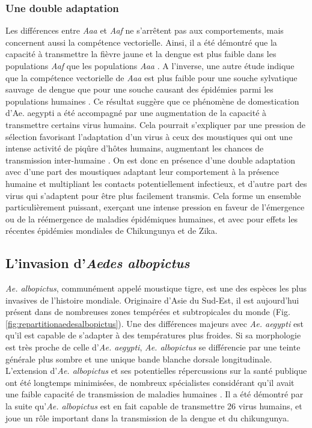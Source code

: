 \subsubsection{Une double adaptation}

Les différences entre {\em Aaa} et {\em Aaf} ne s'arrêtent pas aux comportements, mais concernent aussi la compétence vectorielle. 
Ainsi, il a été démontré que la capacité à transmettre la fièvre jaune et la dengue est plus faible dans les populations {\em Aaf} que les populations {\em Aaa} \cite{black2002flavivirus}.
A l'inverse, une autre étude indique que la compétence vectorielle de {\em Aaa} est plus faible pour une souche sylvatique \guillemotleft sauvage\guillemotright \;\, de dengue que pour une souche causant des épidémies parmi les populations humaines \cite{moncayo2004dengue}.
Ce résultat suggère que ce phénomène de domestication d'{Ae. aegypti} a été accompagné par une augmentation de la capacité à transmettre certains virus humains.
Cela pourrait s'expliquer par une pression de sélection favorisant l'adaptation d'un virus à ceux des moustiques qui ont une intense activité de piqûre d'hôtes humains, augmentant les chances de transmission inter-humaine \cite{powell2013history}.
On est donc en présence d'une double adaptation avec d'une part des moustiques adaptant leur comportement à la présence humaine et multipliant les contacts potentiellement infectieux, et d'autre part des virus qui s'adaptent pour être plus facilement transmis. 
Cela forme un ensemble particulièrement puissant, exerçant une intense pression en faveur de l'émergence ou de la réémergence de maladies épidémiques humaines, et avec pour effets les récentes épidémies mondiales de Chikungunya et de Zika.



\subsection{L'invasion d'{\em Aedes albopictus} }


{\em Ae. albopictus}, communément appelé \guillemotleft moustique tigre\guillemotright \;, est une des espèces les plus invasives de l'histoire mondiale. 
Originaire d'Asie du Sud-Est, il est aujourd'hui présent dans de nombreuses zones tempérées et subtropicales du monde (Fig. \ref{fig:repartitionaedesalbopictus}). 
Une des différences majeurs avec {\em Ae. aegypti} est qu'il est capable de s'adapter à des températures plus froides.
Si sa morphologie est très proche de celle d'{\em Ae. aegypti}, {\em Ae. albopictus} se différencie par une teinte générale plus sombre et une unique bande blanche dorsale longitudinale.
L'extension d'{\em Ae. albopictus} et ses potentielles répercussions sur la santé publique ont été longtemps minimisées, de nombreux spécialistes considérant qu'il avait une faible capacité de transmission de maladies humaines \cite{paupy2009aedes}. 
Il a été démontré par la suite qu'{\em Ae. albopictus} est en fait capable de transmettre 26 virus humains, et joue un rôle important dans la transmission de la dengue et du chikungunya.


